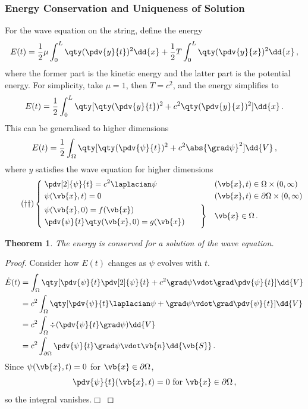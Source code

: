 \documentclass{article}
\theoremstyle{plain}\theoremheaderfont{\normalfont\itshape}\theorembodyfont{\rmfamily}\theoremseparator{.}\newtheorem*{rem}{Remark}\newtheorem*{ex}{Example}\newtheorem*{proof}{Proof}\newtheorem*{altp}{Alternative proof}
\theoremstyle{plain}\theoremheaderfont{\normalfont\bfseries}\theorembodyfont{\rmfamily}\theoremseparator{.}\newtheorem{thm}{Theorem}[section]\newtheorem{lem}[thm]{Lemma}\newtheorem{prop}[thm]{Proposition}\newtheorem*{cor}{Corollary}\newtheorem{defn}[thm]{Definition}\newtheorem{clm}[thm]{Claim}\newtheorem{clminproof}{Claim}
\theoremstyle{break}\theoremheaderfont{\normalfont\itshape}\theorembodyfont{\rmfamily}\theoremseparator{.\medskip}\newtheorem*{proofskip}{Proof}\newtheorem*{exs}{Examples}\newtheorem*{rems}{Remarks}
\theoremstyle{break}\theoremheaderfont{\normalfont\bfseries}\theorembodyfont{\rmfamily}\theoremseparator{.\medskip}\newtheorem{lemskip}[thm]{Lemma}\newtheorem{defnskip}[thm]{Definition}\newtheorem{propskip}[thm]{Proposition}\newtheorem{thmskip}[thm]{Theorem}
\numberwithin{equation}{section}
\newcommand{\qed}{\hfill\ensuremath{\Box}}
\begin{document}
	\subsubsection{Energy Conservation and Uniqueness of Solution}
	For the wave equation on the string, define the energy
	\[E(t)=\frac{1}{2}\mu\int_{0}^{L}\qty(\pdv{y}{t})^2\dd{x}+\frac{1}{2}T\int_{0}^{L}\qty(\pdv{y}{x})^2\dd{x}\,,\]
	where the former part is the kinetic energy and the latter part is the potential energy. For simplicity, take \(\mu=1\), then \(T=c^2\), and the energy simplifies to
	\[E(t)=\frac{1}{2}\int_{0}^{L}\qty[\qty(\pdv{y}{t})^2+c^2\qty(\pdv{y}{x})^2]\dd{x}\,.\]
	This can be generalised to higher dimensions
	\[E(t)=\frac{1}{2}\int_\Omega \qty[\qty(\pdv{\psi}{t})^2+c^2\abs{\grad \psi}^2]\dd{V}\,,\]
	where \(y\) satisfies the wave equation for higher dimensions
	\begin{equation}\tag{\(\dagger\dagger\)}
		\left\{\begin{aligned}
			& \;\pdv[2]{\psi}{t}=c^2\laplacian \psi && (\vb{x},t)\in\Omega\times(0,\infty)\\
			& \;\psi(\vb{x},t)=0 && (\vb{x},t)\in\partial\Omega\times(0,\infty)\\
			& \left.\begin{aligned}
				& \psi(\vb{x},0)=f(\vb{x})\\
				& \pdv{\psi}{t}\qty(\vb{x},0)=g(\vb{x})
			\end{aligned}\qquad\right\} && \vb{x}\in\Omega\,.
		\end{aligned}\right.
	\end{equation}

	\begin{thm}
		The energy is conserved for a solution of the wave equation.
	\end{thm}
	\begin{proof}
		Consider how \(E(t)\) changes as \(\psi\) evolves with \(t\).
		\begin{align*}
			\dot{E}(t)&=\int_\Omega\qty[\pdv{\psi}{t}\pdv[2]{\psi}{t}+c^2\grad \psi\vdot\grad\pdv{\psi}{t}]\dd{V}\\
			&=c^2\int_\Omega\qty[\pdv{\psi}{t}\laplacian \psi+\grad \psi\vdot\grad\pdv{\psi}{t}]\dd{V}\\
			&=c^2\int_\Omega\div(\pdv{\psi}{t}\grad \psi)\dd{V}\\
			&=c^2\int_{\partial\Omega}\pdv{\psi}{t}\grad \psi\vdot\vb{n}\dd{\vb{S}}\,.
		\end{align*}
		Since \(\psi(\vb{x},t)=0\) for \(\vb{x}\in\partial\Omega\),
		\[\pdv{\psi}{t}(\vb{x},t)=0\text{ for }\vb{x}\in\partial\Omega\,,\]
		so the integral vanishes.\qed
	\end{proof}
\end{document}
